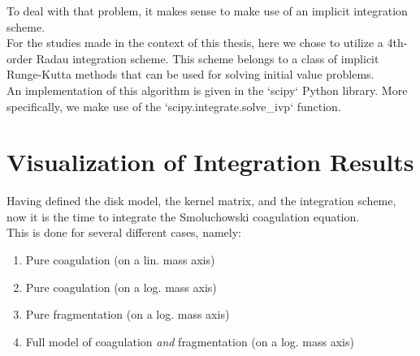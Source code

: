         To deal with that problem, it makes sense to make use of an implicit integration scheme. \\

        For the studies made in the context of this thesis, here we chose to utilize 
        a 4th-order Radau integration scheme. This scheme belongs to a class of 
        implicit Runge-Kutta methods that can be used for solving initial value problems. \\

        An implementation of this algorithm is given in the `scipy` Python library. More 
        specifically, we make use of the `scipy.integrate.solve\_ivp` function.








\section{Visualization of Integration Results}

    Having defined the disk model, the kernel matrix, and the integration scheme, now it 
    is the time to integrate the Smoluchowski coagulation equation. \\ 

    This is done for several different cases, namely: 
    \begin{enumerate}
        \item Pure coagulation (on a lin. mass axis)
        \item Pure coagulation (on a log. mass axis)
        \item Pure fragmentation (on a log. mass axis)
        \item Full model of coagulation \textit{and} fragmentation (on a log. mass axis)
    \end{enumerate}

